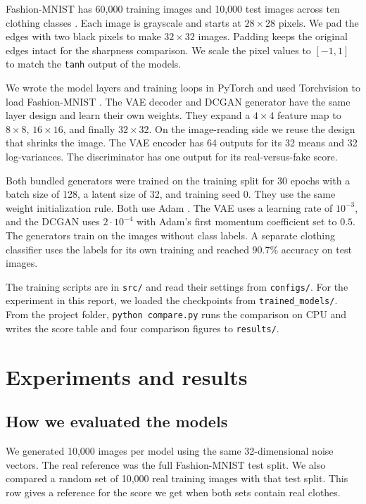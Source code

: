 \documentclass[11pt,letterpaper]{article}
\begin{document}
Fashion-MNIST has 60,000 training images and 10,000 test images across ten
clothing classes \cite{xiao2017}. Each image is grayscale and starts at
\(28\times28\) pixels. We pad the edges with two black pixels to make
\(32\times32\) images. Padding keeps the original edges intact for the
sharpness comparison. We scale the pixel values to \([-1,1]\) to match the
\texttt{tanh} output of the models.

We wrote the model layers and training loops in PyTorch and used
Torchvision to load Fashion-MNIST \cite{pytorch,torchvision}. The VAE
decoder and DCGAN generator have the same layer design and learn their
own weights. They expand a \(4\times4\) feature map to \(8\times8\),
\(16\times16\), and finally \(32\times32\). On the image-reading side we
reuse the design that shrinks the image. The VAE encoder has 64 outputs
for its 32 means and 32 log-variances. The discriminator has one output
for its real-versus-fake score.

Both bundled generators were trained on the training split for 30 epochs
with a batch size of 128, a latent size of 32, and training seed 0. They
use the same weight initialization rule. Both use Adam \cite{adam}. The
VAE uses a learning rate of \(10^{-3}\), and the DCGAN uses
\(2\cdot10^{-4}\) with Adam's first momentum coefficient set to \(0.5\).
The generators train on the images without class labels. A separate
clothing classifier uses the labels for its own training and reached
\(90.7\%\) accuracy on test images.

The training scripts are in \texttt{src/} and read their settings from
\texttt{configs/}. For the experiment in this report, we loaded the
checkpoints from \texttt{trained\_models/}. From the project folder,
\texttt{python compare.py} runs the comparison on CPU and writes the score
table and four comparison figures to \texttt{results/}.

\section{Experiments and results}

\subsection{How we evaluated the models}

We generated 10,000 images per model using the same 32-dimensional noise
vectors. The real reference was the full Fashion-MNIST test split. We also
compared a random set of 10,000 real training images with that test split.
This row gives a reference for the score we get when both sets contain
real clothes.
\end{document}
